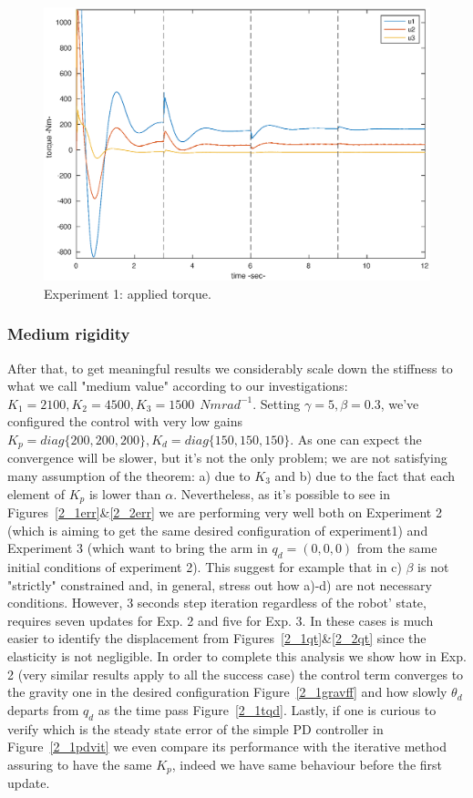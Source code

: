 \begin{figure}[h!]
\centerline{\includegraphics[scale=0.42]{figures/1_1_ceffort.eps}}
\caption{\label{1_1ceff}
Experiment 1: applied torque.}
\end{figure}
\clearpage
\subsubsection{Medium rigidity}
After that, to get meaningful results we considerably scale down the stiffness to what we call "medium value" according to our investigations: $K_1 = 2100, K_2 = 4500, K_3 = 1500 ~~Nmrad^{-1}$. Setting $\gamma = 5, \beta = 0.3$, we've configured the control with very low gains $K_p = diag\{200, 200, 200\}, K_d=diag\{150,150,150\}$. As one can expect the convergence will be slower, but it's not the only problem; we are not satisfying many assumption of the theorem: a) due to $K_3$ and b) due to the fact that each element of $K_p$ is lower than \(\alpha\). Nevertheless, as it's possible to see in Figures~\ref{2_1err}\&\ref{2_2err} we are performing very well both on Experiment 2 (which is aiming to get the same desired configuration of experiment1) and Experiment 3 (which want to bring the arm in $q_d=(0,0,0)$ from the same initial conditions of experiment 2). This suggest for example that in c) $\beta$ is not "strictly" constrained and, in general, stress out how a)-d) are not necessary conditions.  
However, 3 seconds step iteration regardless of the robot’ state, requires seven updates for Exp. 2 and five for Exp. 3. In these cases is much easier to identify the displacement from Figures~\ref{2_1qt}\&\ref{2_2qt} since the elasticity is not negligible.
In order to complete this analysis we show how in Exp. 2 (very similar results apply to all the success case) the control term converges to the gravity one in the desired configuration Figure~\ref{2_1gravff} and how slowly $\theta_d$ departs from $q_d$ as the time pass Figure~\ref{2_1tqd}. Lastly, if one is curious to verify which is the steady state error of the simple PD controller in Figure~\ref{2_1pdvit} we even compare its performance with the iterative method assuring to have the same $K_p$, indeed we have same behaviour before the first update.

